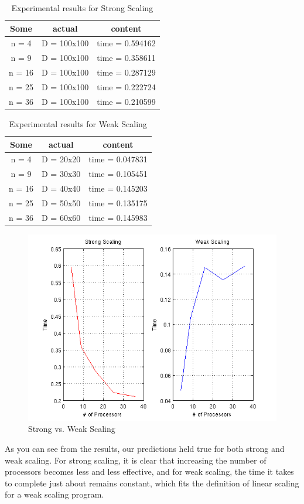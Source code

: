 \documentclass{article}
\begin{document}
\begin{table}[h!]
  \centering
  \caption{Experimental results for Strong Scaling}
  \label{tab:table1}
  \begin{tabular}{ccc}
    \toprule
    Some & actual & content\\
    \midrule
    n = 4 & D = 100x100 & time = 0.594162\\
    n = 9 & D = 100x100 & time = 0.358611\\
    n = 16 & D = 100x100 & time = 0.287129\\
    n = 25 & D = 100x100 & time = 0.222724\\
    n = 36 & D = 100x100 & time = 0.210599\\
    \bottomrule
  \end{tabular}
\end{table}
\begin{table}[h!]
  \centering
  \caption{Experimental results for Weak Scaling}
  \label{tab:table1}
  \begin{tabular}{ccc}
    \toprule
    Some & actual & content\\
    \midrule
    n = 4 & D = 20x20 & time = 0.047831\\
    n = 9 & D = 30x30 & time = 0.105451\\
    n = 16 & D = 40x40 & time = 0.145203\\
    n = 25 & D = 50x50 & time = 0.135175\\
    n = 36 & D = 60x60 & time = 0.145983\\
    \bottomrule
  \end{tabular}
\end{table}
\begin{figure}[h]
\caption{Strong vs. Weak Scaling}
\centering
\includegraphics[width=1.0\textwidth]{proc_scaling}
\end{figure}
\newpage
As you can see from the results, our predictions held true for both strong and weak scaling. For strong scaling, it is clear that increasing the number of processors becomes less and less effective, and for weak scaling, the time it takes to complete just about remains constant, which fits the definition of linear scaling for a weak scaling program.
\end{document}
